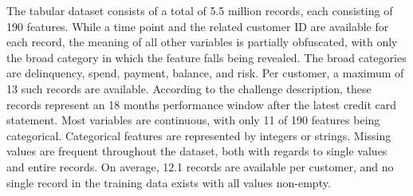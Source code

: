 \documentclass[runningheads]{llncs}
\begin{document}
The tabular dataset consists of a total of 5.5 million records, each consisting of 190 features. While a time point and the related customer ID are available for each record, the meaning of all other variables is partially obfuscated, with only the broad category in which the feature falls being revealed. The broad categories are delinquency, spend, payment, balance, and risk. Per customer, a maximum of 13 such records are available. According to the challenge description, these records represent an 18 months performance window after the latest credit card statement. Most variables are continuous, with only 11 of 190 features being categorical. Categorical features are represented by integers or strings. Missing values are frequent throughout the dataset, both with regards to single values and entire records. On average, 12.1 records are available per customer, and no single record in the training data exists with all values non-empty.

\end{document}
